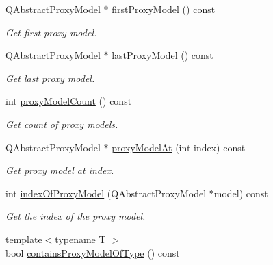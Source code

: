 \begin{DoxyCompactItemize}
Q\+Abstract\+Proxy\+Model $\ast$ \hyperlink{class_mdt_1_1_item_model_1_1_proxy_model_container_ae9bf6048838f4cbf29b6a2b21de64184}{first\+Proxy\+Model} () const 
\begin{DoxyCompactList}\small\item\em Get first proxy model. \end{DoxyCompactList}\item 
Q\+Abstract\+Proxy\+Model $\ast$ \hyperlink{class_mdt_1_1_item_model_1_1_proxy_model_container_a36918ea3afc68b988252a48f56923299}{last\+Proxy\+Model} () const 
\begin{DoxyCompactList}\small\item\em Get last proxy model. \end{DoxyCompactList}\item 
int \hyperlink{class_mdt_1_1_item_model_1_1_proxy_model_container_ae0764cece09670828ea2e6510e674181}{proxy\+Model\+Count} () const \hypertarget{class_mdt_1_1_item_model_1_1_proxy_model_container_ae0764cece09670828ea2e6510e674181}{}\label{class_mdt_1_1_item_model_1_1_proxy_model_container_ae0764cece09670828ea2e6510e674181}

\begin{DoxyCompactList}\small\item\em Get count of proxy models. \end{DoxyCompactList}\item 
Q\+Abstract\+Proxy\+Model $\ast$ \hyperlink{class_mdt_1_1_item_model_1_1_proxy_model_container_ad62fd2a1ea052a329dc270b1a56b15e5}{proxy\+Model\+At} (int index) const 
\begin{DoxyCompactList}\small\item\em Get proxy model at index. \end{DoxyCompactList}\item 
int \hyperlink{class_mdt_1_1_item_model_1_1_proxy_model_container_a67e280816efb16d71549adb28203d334}{index\+Of\+Proxy\+Model} (Q\+Abstract\+Proxy\+Model $\ast$model) const 
\begin{DoxyCompactList}\small\item\em Get the index of the proxy model. \end{DoxyCompactList}\item 
{\footnotesize template$<$typename T $>$ }\\bool \hyperlink{class_mdt_1_1_item_model_1_1_proxy_model_container_a8a879abfeaf15a007615de5a7d2bc5e6}{contains\+Proxy\+Model\+Of\+Type} () const \hypertarget{class_mdt_1_1_item_model_1_1_proxy_model_container_a8a879abfeaf15a007615de5a7d2bc5e6}{}\label{class_mdt_1_1_item_model_1_1_proxy_model_container_a8a879abfeaf15a007615de5a7d2bc5e6}


\end{DoxyCompactItemize}
